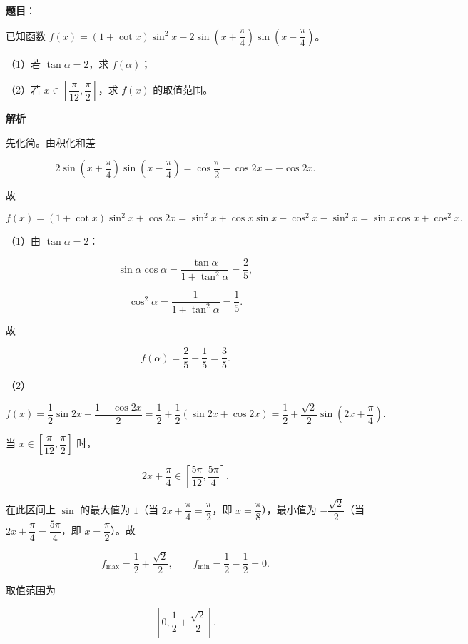 \begin{answer}

\textbf{题目}：

已知函数 $f(x)=(1+\cot x)\sin^2x-2\sin\left(x+\dfrac\pi4\right)\sin\left(x-\dfrac\pi4\right)$。

（1）若 $\tan\alpha=2$，求 $f(\alpha)$；

（2）若 $x\in\left[\dfrac\pi{12},\dfrac\pi2\right]$，求 $f(x)$ 的取值范围。

\textbf{解析}

先化简。由积化和差

\nopagebreak[4]
\[2\sin\left(x+\frac\pi4\right)\sin\left(x-\frac\pi4\right)
=\cos\frac\pi2-\cos2x=-\cos2x.\]

故

\nopagebreak[4]
\[f(x)=(1+\cot x)\sin^2x+\cos2x
=\sin^2x+\cos x\sin x+\cos^2x-\sin^2x
=\sin x\cos x+\cos^2x.\]

（1）由 $\tan\alpha=2$：

\nopagebreak[4]
\[\sin\alpha\cos\alpha=\frac{\tan\alpha}{1+\tan^2\alpha}=\frac25,\]

\nopagebreak[4]
\[\cos^2\alpha=\frac1{1+\tan^2\alpha}=\frac15.\]

故

\nopagebreak[4]
\[f(\alpha)=\frac25+\frac15=\frac35.\]

（2）

\nopagebreak[4]
\[f(x)=\frac12\sin2x+\frac{1+\cos2x}{2}
=\frac12+\frac12(\sin2x+\cos2x)
=\frac12+\frac{\sqrt2}{2}\sin\left(2x+\frac\pi4\right).\]

当 $x\in\left[\dfrac\pi{12},\dfrac\pi2\right]$ 时，

\nopagebreak[4]
\[2x+\frac\pi4\in\left[\frac{5\pi}{12},\frac{5\pi}{4}\right].\]

在此区间上 $\sin$ 的最大值为 $1$（当 $2x+\dfrac\pi4=\dfrac\pi2$，即 $x=\dfrac\pi8$），最小值为 $-\dfrac{\sqrt2}{2}$（当 $2x+\dfrac\pi4=\dfrac{5\pi}4$，即 $x=\dfrac\pi2$）。故

\nopagebreak[4]
\[f_{\max}=\frac12+\frac{\sqrt2}{2},\qquad
f_{\min}=\frac12-\frac12=0.\]

取值范围为

\nopagebreak[4]
\[\left[0,\frac12+\frac{\sqrt2}{2}\right].\]


\end{answer}

